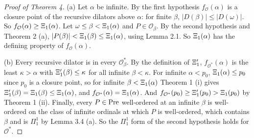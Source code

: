 \documentclass[11pt]{article}
\begin{document}
\begin{proof}[Proof of Theorem 4] (a) Let $\alpha$ be infinite. By the first hypothesis $f_{\mathcal O}(\alpha)$ is a
closure point of the recursive dilators above $\alpha$: for finite $\beta$, $|D(\beta)| \le |D(\omega)|$. So
$f_{\mathcal O}(\alpha) \ge \Xi_1(\alpha)$. Let $\omega \le \beta < \Xi_1(\alpha)$ and $P \in \mathcal O_\beta$. By the
second hypothesis and Theorem 2 (a), $|P(\beta)| < \Xi_1(\beta) \le \Xi_1(\alpha)$, using Lemma 2.1. So $\Xi_1(\alpha)$
has the defining property of $f_{\mathcal O}(\alpha)$.

(b) Every recursive dilator is in every $\mathcal O^*_\beta$. By the definition of $\Xi'_1$,
$f_{\mathcal O^*}(\alpha)$ is the least $\kappa > \alpha$ with $\Xi'_1(\beta) \le \kappa$ for all infinite
$\beta < \kappa$. For infinite $\alpha < p_0$, $\Xi_1(\alpha) \le p_0$ since $p_0$ is a closure point, so for
infinite $\beta < \Xi_1(\alpha)$ Theorem 1 (i) gives $\Xi'_1(\beta) = \Xi_1(\beta) \le \Xi_1(\alpha)$, and
$f_{\mathcal O^*}(\alpha) = \Xi_1(\alpha)$. And $f_{\mathcal O^*}(p_0) \ge \Xi'_1(p_0) > \Xi_1(p_0)$ by Theorem 1 (ii).
Finally, every $P \in \mathrm{Pre}$ well-ordered at an infinite $\beta$ is well-ordered on the class of infinite ordinals at
which $P$ is well-ordered, which contains $\beta$ and is $\Pi^1_1$ by Lemma 3.4 (a). So the $\Pi^1_1$ form of the
second hypothesis holds for $\mathcal O^*$.
\end{proof}
\end{document}
